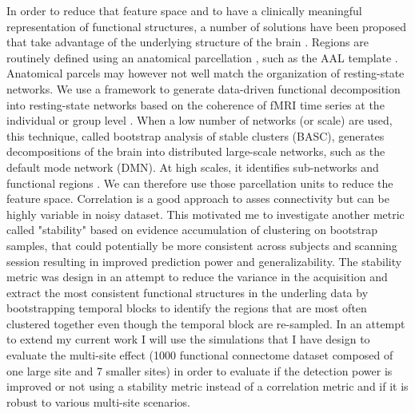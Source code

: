 In order to reduce that feature space and to have a clinically meaningful representation of functional structures, a number of solutions have been proposed that take advantage of the underlying structure of the brain \citep{Heuvel2009}. Regions are routinely defined using an anatomical parcellation \citep{He2009}, such as the AAL template \citep{Tzourio-Mazoyer2002}. Anatomical parcels may however not well match the organization of resting-state networks. We use a framework to generate data-driven functional decomposition into resting-state networks based on the coherence of fMRI time series at the individual or group level \citep{Bellec2006,Bellec2010c}. When a low number of networks (or scale) are used, this technique, called bootstrap analysis of stable clusters (BASC), generates decompositions of the brain into distributed large-scale networks, such as the default mode network (DMN). At high scales, it identifies sub-networks and functional regions \citep{Kelly2012}. We can therefore use those 
parcellation units to reduce the feature space.
Correlation is a good approach to asses connectivity but can be highly variable in noisy dataset. This motivated me to investigate another metric called "stability" based on evidence accumulation of clustering on bootstrap samples, that could potentially be more consistent across subjects and scanning session resulting in improved prediction power and generalizability. The stability metric was design in an attempt to reduce the variance in the acquisition and extract the most consistent functional structures in the underling data by bootstrapping temporal blocks to identify the regions that are most often clustered together even though the temporal block are re-sampled. In an attempt to extend my current work I will use the simulations that I have design to evaluate the multi-site effect (1000 functional connectome dataset composed of one large site and 7 smaller sites) in order to evaluate if the detection power is improved or not using a stability metric instead of a correlation metric and if it is robust 
to various multi-site scenarios.


